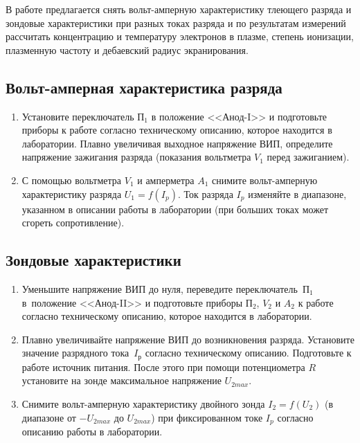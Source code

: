 \begin{lab:task}

В работе предлагается снять вольт-амперную характеристику тлеющего разряда и зондовые характеристики при разных токах
разряда и по результатам измерений рассчитать концентрацию и температуру электронов в плазме, степень ионизации,
плазменную частоту и дебаевский радиус экранирования.

 

\subsection*{Вольт-амперная характеристика разряда}

\begin{enumerate}
\item Установите переключатель П$_1$ в положение <<Анод-I>> и подготовьте приборы к работе согласно техническому описанию, которое находится в лаборатории. Плавно увеличивая выходное напряжение ВИП, определите напряжение зажигания разряда (показания вольтметра $V_{1}$ перед зажиганием). 

\item С помощью вольтметра $V_{1}$ и амперметра $A_{1}$ снимите вольт-амперную характеристику разряда $U_{1}=f(I_{p})$. Ток разряда $I_{p}$ изменяйте в диапазоне, указанном в описании работы в лаборатории (при больших токах может сгореть сопротивление).

\end{enumerate}

\subsection*{Зондовые характеристики}

\begin{enumerate}
\item Уменьшите напряжение ВИП до нуля, переведите переключатель~П$_1$
в~положение <<Анод-II>> и подготовьте приборы П$_{2}$, $V_{2}$ и $A_{2}$ к работе согласно техническому описанию, которое находится в лаборатории. 

\item Плавно увеличивайте напряжение ВИП до возникновения разряда. Установите значение разрядного
тока~$I_{р}$ согласно техническому описанию. Подготовьте к работе источник питания. После этого при помощи потенциометра $R$ установите на зонде максимальное напряжение $U_{2 max}$. 

\item Снимите вольт-амперную характеристику двойного зонда $I_{2}=f(U_{2})$ (в диапазоне от $-U_{2 max}$ до $U_{2 max}$) при фиксированном токе $I_{p}$ согласно описанию работы в лаборатории.


\end{enumerate}
\end{lab:task}
